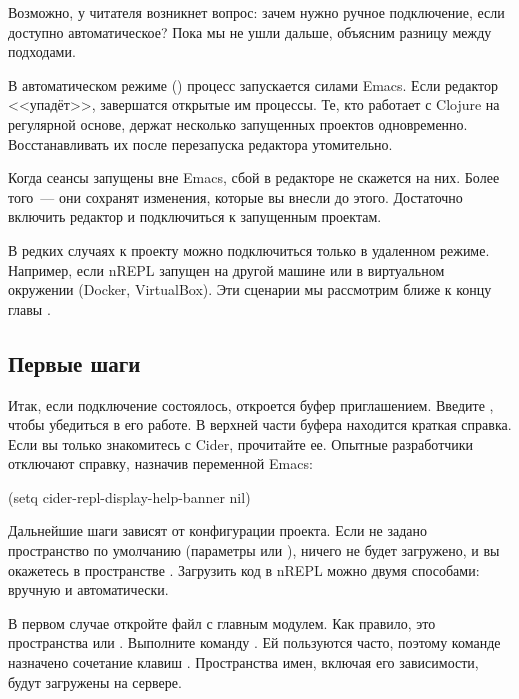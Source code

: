 Возможно, у читателя возникнет вопрос: зачем нужно ручное подключение, если доступно автоматическое? Пока мы не ушли дальше, объясним разницу между подходами.

В автоматическом режиме () процесс  запускается силами Emacs. Если редактор <<упадёт>>, завершатся открытые им процессы. Те, кто работает с Clojure на регулярной основе, держат несколько запущенных проектов одновременно. Восстанавливать их после перезапуска редактора утомительно.

Когда сеансы запущены вне Emacs, сбой в редакторе не скажется на них. Более того~--- они сохранят изменения, которые вы внесли до этого. Достаточно включить редактор и подключиться к запущенным проектам.

В редких случаях к проекту можно подключиться только в удаленном режиме. Например, если nREPL запущен на другой машине или в виртуальном окружении (Docker, VirtualBox). Эти сценарии мы рассмотрим ближе к концу главы .

\subsection{Первые шаги}

Итак, если подключение состоялось, откроется буфер  приглашением. Введите , чтобы убедиться в его работе. В верхней части буфера находится краткая справка. Если вы только знакомитесь с Cider, прочитайте ее. Опытные разработчики отключают справку, назначив  переменной Emacs:

\begin{english}
  \begin{lisp}
(setq cider-repl-display-help-banner nil)
  \end{lisp}
\end{english}


Дальнейшие шаги зависят от конфигурации проекта. Если не задано пространство по умолчанию (параметры  или  \arr {}), ничего не будет загружено, и вы окажетесь в пространстве . Загрузить код в nREPL можно двумя способами: вручную и автоматически.

В первом случае откройте файл с главным модулем. Как правило, это пространства  или . Выполните команду . Ей пользуются часто, поэтому команде назначено сочетание клавиш . Пространства имен, включая его зависимости, будут загружены на сервере.

